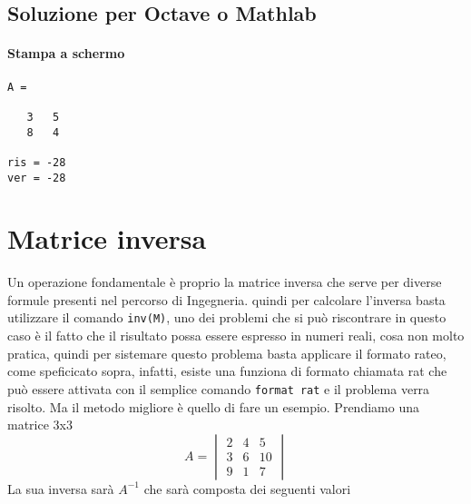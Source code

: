 \documentclass{book}
\begin{document}
\subsection{Soluzione per Octave o Mathlab}
\label{sec:solmatoctes2}



\paragraph{Stampa a schermo}

\begin{verbatim}
A =

   3   5
   8   4

ris = -28
ver = -28
\end{verbatim}

\section{Matrice inversa}
\label{sec:mtxInv}
Un operazione fondamentale è proprio la matrice inversa che serve per diverse
formule presenti nel percorso di Ingegneria. quindi per calcolare l'inversa basta utilizzare il comando \lstinline|inv(M)|, uno dei problemi che si può
riscontrare in questo caso è il fatto che il risultato possa essere espresso in
numeri reali, cosa non molto pratica, quindi per sistemare questo problema
basta applicare il formato rateo, come speficicato sopra, infatti, esiste
una funziona di formato chiamata rat che può essere attivata con il semplice
comando \lstinline|format rat| e il problema verra risolto.
Ma il metodo migliore è quello di fare un esempio. Prendiamo una matrice 3x3
\begin{equation}
  \label{eq:es3}
  A=\begin{vmatrix}
    2  & 4 & 5\\
    3  & 6 & 10\\
    9  & 1 & 7
  \end{vmatrix}
\end{equation}
La sua inversa sarà $A^{-1}$ che sarà composta dei seguenti valori
\end{document}

